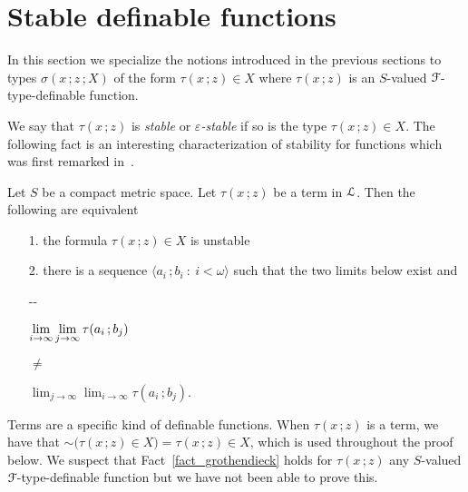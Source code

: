 \section{Stable definable functions}
\def\medrel#1{\parbox{5ex}{\hfil $#1$}}
\def\ceq#1#2#3{\parbox[t]{28ex}{$\displaystyle #1$}\medrel{#2}{$\displaystyle #3$}}

In this section we specialize the notions introduced in the previous sections to types $\sigma(x\,;z\,;X)$ of the form $\tau(x\,;z)\in X$ where $\tau(x\,;z)$ is an $S$-valued ${\EuScript F}$-type-definable function.

We say that $\tau(x\,;z)$ is \emph{stable\/} or \emph{$\varepsilon$-stable\/} if so is the type $\tau(x\,;z)\in X$.
The following fact is an interesting characterization of stability for functions which was first remarked in~\cite{B}.

\begin{fact}\label{fact_grothendieck}
  Let $S$ be a compact metric space.
  Let $\tau(x\,;z)$ be a term in ${\EuScript L}$.
  Then the following are equivalent
  \begin{itemize}
    \item [1.] the formula $\tau(x\,;z)\in X$ is unstable
    \item [2.] there is a sequence $\langle a_i\,;b_i\ :\ i<\omega\rangle$ such that the two limits below exist and\smallskip
    
    \noindent\kern-\kern-
    \ceq{\hfill \lim_{i\to\infty}\lim_{j\to\infty}\tau(a_i\,;b_j)}{\neq}{\lim_{j\to\infty}\lim_{i\to\infty}\tau(a_i\,;b_j).}

    



  \end{itemize}
\end{fact}  
  Terms are a specific kind of definable functions.
  When $\tau(x\,;z)$ is a term, we have that ${\sim}\big(\tau(x\,;z)\in X\big)=\tau(x\,;z)\in X$, which is used throughout the proof below.
  We suspect that Fact~\ref{fact_grothendieck} holds for $\tau(x\,;z)$ any $S$-valued ${\EuScript F}$-type-definable function but we have not been able to prove this.

